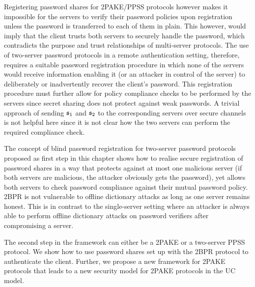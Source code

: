 Registering password shares for \ac{2PAKE}/\ac{PPSS} protocols however makes it impossible for the servers to verify their password policies upon registration unless the password is transferred to each of them in plain. 
This however, would imply that the client trusts both servers to securely handle the password, which contradicts the purpose and trust relationships of multi-server protocols.
The use of two-server password protocols in a remote authentication setting, therefore, requires a suitable password registration procedure in which none of the servers would receive information enabling it (or an attacker in control of the server) to deliberately or inadvertently recover the client's password.
This registration procedure must further allow for policy compliance checks to be performed by the servers since secret sharing does not protect against weak passwords.
A trivial approach of sending $\mathfrak{s}_1$ and $\mathfrak{s}_2$ to the corresponding servers over secure channels is not helpful here since it is not clear how the two servers can perform the required compliance check.

The concept of blind password registration for two-server password protocols proposed as first step in this chapter shows how to realise secure registration of password shares in a way that protects against at most one malicious server (if both servers are malicious, the attacker obviously gets the password), yet allows both servers to check password compliance against their mutual password policy.
\ac{2BPR} is not vulnerable to offline dictionary attacks as long as one server remains honest.
This is in contrast to the single-server setting where an attacker is always able to perform offline dictionary attacks on password verifiers after compromising a server. 

The second step in the framework can either be a \ac{2PAKE} or a two-server \ac{PPSS} protocol.
We show how to use password shares set up with the \ac{2BPR} protocol to authenticate the client.
Further, we propose a new framework for \ac{2PAKE} protocols that leads to a new security model for \ac{2PAKE} protocols in the \ac{UC} model.


